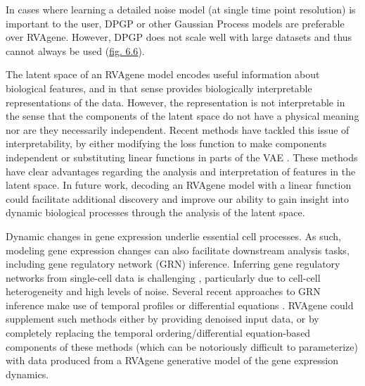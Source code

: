 {In cases where learning a detailed noise model (at single time point resolution) is important to the user, DPGP or other Gaussian Process models are preferable over RVAgene.}
However, DPGP does not scale well with large datasets and thus cannot always be used
(\hyperref[fig:fig7]{fig. 6.6}).
\par 
The latent space of an RVAgene model encodes useful information about biological features, and in that sense provides biologically interpretable representations of the data. However, the representation is not interpretable in the sense that the components of the latent space do not have a physical meaning nor are they necessarily independent. Recent methods have tackled this issue of interpretability, by either modifying the loss function to make components independent \citep{higgins2016beta} or substituting linear functions in parts of the VAE \citep{svensson2020interpretable, ainsworth2018oi}. These methods have clear advantages regarding the analysis and interpretation of features in the latent space. In future work, decoding an RVAgene model with a linear function \citep{svensson2020interpretable} could facilitate additional discovery and improve our ability to gain insight into dynamic biological processes through the analysis of the latent space.
\par 
Dynamic changes in gene expression underlie essential cell processes. As such, modeling gene expression changes can also facilitate downstream analysis tasks, including gene regulatory network (GRN) inference. Inferring gene regulatory networks from single-cell data is challenging \citep{chen18_evaluating}, particularly due to cell-cell heterogeneity and high levels of noise. Several recent approaches to GRN inference make use of temporal profiles \citep{deshpande19_network, kim20_tenet}  
or differential equations \citep{ma20_inference, aubin-frankowski20_gene, matsumoto17_scode}. RVAgene could supplement such methods either by providing denoised input data, or by completely replacing the temporal ordering/differential equation-based components of these methods (which can be notoriously difficult to parameterize) with data produced from a RVAgene generative model of the gene expression dynamics.
\par 
